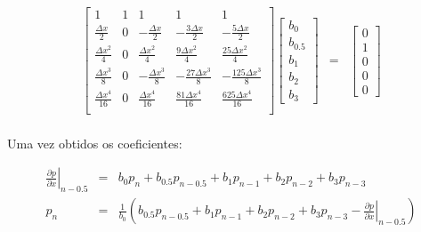 \documentclass[introducao.tex]{subfiles}
\begin{document}
\begin{eqnarray}
\left[\begin{array}{ccccc}
1 & 1 & 1 & 1 & 1\\
\frac{\Delta x}{2} & 0 & -\frac{\Delta x}{2} & -\frac{3\Delta x}{2} & -\frac{5\Delta x}{2}\\
\frac{\Delta x^2}{4} & 0 & \frac{\Delta x^2}{4} & \frac{9\Delta x^2}{4} & \frac{25\Delta x^2}{4}\\
\frac{\Delta x^3}{8} & 0 & -\frac{\Delta x^3}{8} & -\frac{27\Delta x^3}{8} & -\frac{125\Delta x^3}{8}\\
\frac{\Delta x^4}{16} & 0 & \frac{\Delta x^4}{16} & \frac{81\Delta x^4}{16} & \frac{625\Delta x^4}{16}\\
\end{array}\right]\left[\begin{array}{c}b_0\\ b_{0.5}\\ b_1\\ b_2\\ b_3\end{array}\right] & = & \left[\begin{array}{c}0\\ 1\\ 0\\ 0\\ 0\end{array}\right]
\end{eqnarray}

\paragraph{} Uma vez obtidos os coeficientes:

\begin{eqnarray}
\left.\frac{\partial p}{\partial x}\right|_{n-0.5} & = & b_0 p_n + b_{0.5} p_{n-0.5} + b_1 p_{n-1} + b_2 p_{n-2} + b_3 p_{n-3}\\
p_n & = & \frac{1}{b_0}\left(b_{0.5} p_{n-0.5} + b_1 p_{n-1} + b_2 p_{n-2} + b_3 p_{n-3} - \left.\frac{\partial p}{\partial x}\right|_{n-0.5}\right)
\end{eqnarray}
\end{document}
